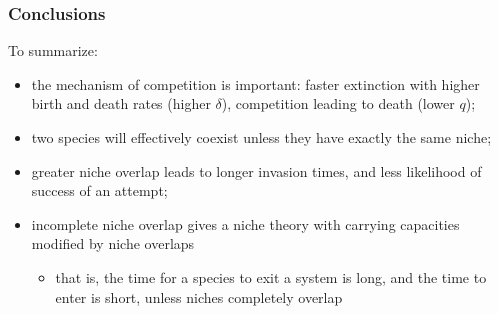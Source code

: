 \documentclass[dvipsnames]{beamer}
\begin{document}
\begin{frame}
\frametitle{Conclusions}
\large{
To summarize:
\begin{itemize}
	\item the mechanism of competition is important: faster extinction with higher birth and death rates (higher $\delta$), competition leading to death (lower $q$); 
	\pause
	\item two species will effectively coexist unless they have exactly the same niche; 
	\pause
	\item greater niche overlap leads to longer invasion times, and less likelihood of success of an attempt; %
	\pause
	\item incomplete niche overlap gives a niche theory with carrying capacities modified by niche overlaps%
	\begin{itemize}
		\item that is, the time for a species to exit a system is long, and the time to enter is short, unless niches completely overlap
	\end{itemize}
\end{itemize}
}
\end{frame}

\end{document}
